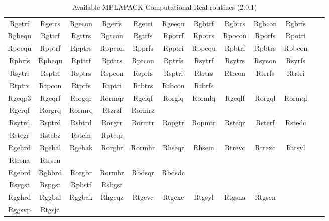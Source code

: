 \documentclass[12pt]{article}
\begin{document}
\begin{table}
\caption{Available MPLAPACK Computational Real routines (2.0.1)}\label{mplapackcomp_real}
\begin{center}
{\tt
\begin{tabular}{cccccccccccc} \hline
Rgetrf & Rgetrs & Rgecon & Rgerfs & Rgetri & Rgeequ & Rgbtrf & Rgbtrs & Rgbcon & Rgbrfs \\
Rgbequ & Rgttrf & Rgttrs & Rgtcon & Rgtrfs & Rpotrf & Rpotrs & Rpocon & Rporfs & Rpotri \\
Rpoequ & Rpptrf & Rpptrs & Rppcon & Rpprfs & Rpptri & Rppequ & Rpbtrf & Rpbtrs & Rpbcon \\
Rpbrfs & Rpbequ & Rpttrf & Rpttrs & Rptcon & Rptrfs & Rsytrf & Rsytrs & Rsycon & Rsyrfs \\
Rsytri & Rsptrf & Rsptrs & Rspcon & Rsprfs & Rsptri & Rtrtrs & Rtrcon & Rtrrfs & Rtrtri \\
Rtptrs & Rtpcon & Rtprfs & Rtptri & Rtbtrs & Rtbcon & Rtbrfs \\ \hline
Rgeqp3 & Rgeqrf & Rorgqr & Rormqr & Rgelqf & Rorglq & Rormlq & Rgeqlf & Rorgql & Rormql \\
Rgerqf & Rorgrq & Rormrq & Rtzrzf & Rormrz \\ \hline
Rsytrd & Rsptrd & Rsbtrd & Rorgtr & Rormtr & Ropgtr & Ropmtr & Rsteqr & Rsterf & Rstedc \\
Rstegr & Rstebz & Rstein & Rpteqr \\ \hline
Rgehrd & Rgebal & Rgebak & Rorghr & Rormhr & Rhseqr & Rhsein & Rtrevc & Rtrexc & Rtrsyl \\
Rtrsna & Rtrsen \\ \hline
Rgebrd & Rgbbrd & Rorgbr & Rormbr & Rbdsqr & Rbdsdc \\ \hline
Rsygst & Rspgst & Rpbstf & Rsbgst \\ \hline
Rgghrd & Rggbal & Rggbak & Rhgeqz & Rtgevc & Rtgexc & Rtgsyl & Rtgsna & Rtgsen \\ \hline
Rggsvp & Rtgsja \\
\hline
\end{tabular}
}
\end{center}
\end{table}
\end{document}

